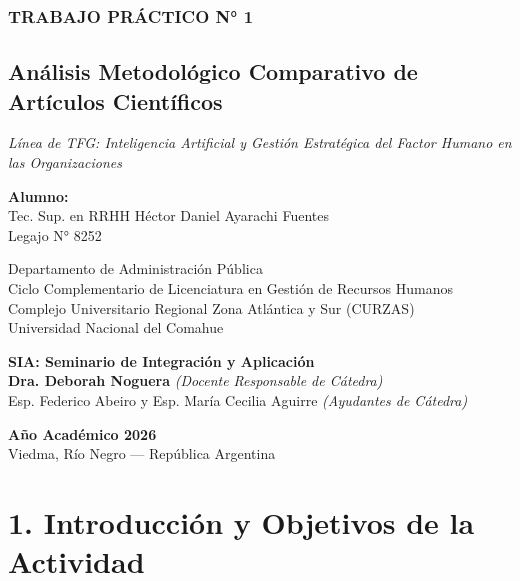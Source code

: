 \documentclass[
  spanish,
  letterpaper,
  DIV=11,
  numbers=noendperiod]{scrartcl}
\author{}
\date{}
\begin{document}
\hfill\break

\subsubsection*{TRABAJO PRÁCTICO N° 1}\label{trabajo-pruxe1ctico-n-1}

\subsection*{Análisis Metodológico Comparativo de Artículos
Científicos}\label{anuxe1lisis-metodoluxf3gico-comparativo-de-artuxedculos-cientuxedficos}

\emph{Línea de TFG: Inteligencia Artificial y Gestión Estratégica del
Factor Humano en las Organizaciones}

\hfill\break

\textbf{Alumno:}\\
Tec. Sup. en RRHH Héctor Daniel Ayarachi Fuentes\\
Legajo N° 8252

\hfill\break

Departamento de Administración Pública\\
Ciclo Complementario de Licenciatura en Gestión de Recursos Humanos\\
Complejo Universitario Regional Zona Atlántica y Sur (CURZAS)\\
Universidad Nacional del Comahue

\hfill\break

\textbf{SIA: Seminario de Integración y Aplicación}\\
\textbf{Dra. Deborah Noguera} \emph{(Docente Responsable de Cátedra)}\\
Esp. Federico Abeiro y Esp. María Cecilia Aguirre \emph{(Ayudantes de
Cátedra)}

\hfill\break

\textbf{Año Académico 2026}\\
Viedma, Río Negro --- República Argentina

\newpage{}

\section{1. Introducción y Objetivos de la
Actividad}\label{introducciuxf3n-y-objetivos-de-la-actividad}
\end{document}
